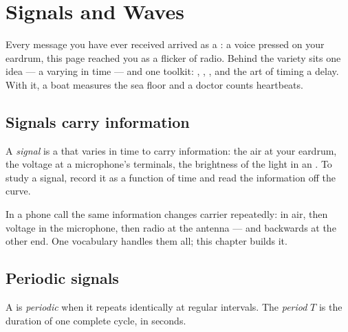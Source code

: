 \chapter{Signals and Waves}\label{ch:g10:signals-and-waves}

Every message you have ever received arrived as a : a voice pressed
on your eardrum, this page reached you as a flicker of radio. Behind the
variety sits one idea --- a  varying in time --- and one
toolkit: , , , and the art of timing a delay.
With it, a boat measures the sea floor and a doctor counts heartbeats.

\section{Signals carry information}

\begin{definition}[Signal]\label{def:g10:signals-and-waves:signal}
A \emph{signal} is a  that varies in time
to carry information: the air  at your eardrum, the voltage at a
microphone's terminals, the brightness of the light in an .
To study a signal, record it as a function of time and read the
information off the curve.
\end{definition}

In a phone call the same information changes carrier repeatedly:
 in air, then voltage in the microphone, then radio at the
antenna --- and backwards at the other end. One vocabulary handles them
all; this chapter builds it.

\section{Periodic signals}

\begin{definition}\label{def:g10:signals-and-waves:period}
A  is \emph{periodic} when it repeats
identically at regular intervals. The \emph{period} $T$ is
the duration of one complete cycle, in seconds.
\end{definition}


